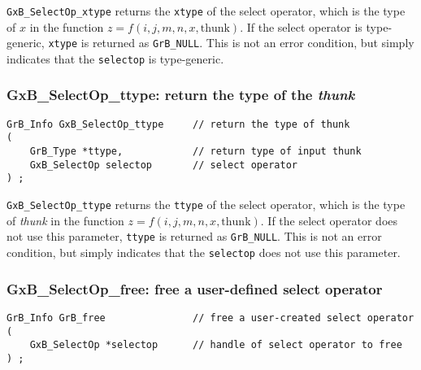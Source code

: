 \documentclass[12pt]{article}
\begin{document}
\verb'GxB_SelectOp_xtype' returns the \verb'xtype' of the select operator,
which is the type of $x$ in the function $z=f(i,j,m,n,x,\mbox{thunk})$.  If the
select operator is type-generic, \verb'xtype' is returned as \verb'GrB_NULL'.
This is not an error condition, but simply indicates that the
\verb'selectop' is type-generic.

\subsubsection{{\sf GxB\_SelectOp\_ttype:} return the type of the {\em thunk}}
\label{selectop_ttype}

\begin{mdframed}[userdefinedwidth=6in]
{\footnotesize
\begin{verbatim}
GrB_Info GxB_SelectOp_ttype     // return the type of thunk
(
    GrB_Type *ttype,            // return type of input thunk
    GxB_SelectOp selectop       // select operator
) ;

\end{verbatim}
}\end{mdframed}

\verb'GxB_SelectOp_ttype' returns the \verb'ttype' of the select operator,
which is the type of {\em thunk} in the function $z=f(i,j,m,n,x,\mbox{thunk})$.
If the select operator does not use this parameter, \verb'ttype' is returned as
\verb'GrB_NULL'.  This is not an error condition, but simply indicates that the
\verb'selectop' does not use this parameter.

\subsubsection{{\sf GxB\_SelectOp\_free:} free a user-defined select operator}
\label{selectop_free}

\begin{mdframed}[userdefinedwidth=6in]
{\footnotesize
\begin{verbatim}
GrB_Info GrB_free               // free a user-created select operator
(
    GxB_SelectOp *selectop      // handle of select operator to free
) ;
\end{verbatim}
}\end{mdframed}
\end{document}
